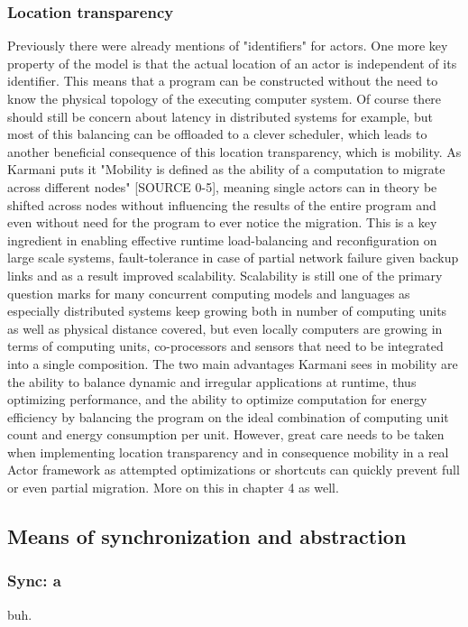 \documentclass[A4]{article}
\begin{document}
\subsubsection{Location transparency}
Previously there were already mentions of "identifiers" for actors. One more key property of the model is that the actual location of an actor is independent of its identifier. This means that a program can be constructed without the need to know the physical topology of the executing computer system. Of course there should still be concern about latency in distributed systems for example, but most of this balancing can be offloaded to a clever scheduler, which leads to another beneficial consequence of this location transparency, which is mobility.
As Karmani puts it "Mobility is defined as the ability of a computation to migrate across different nodes" [SOURCE 0-5], meaning single actors can in theory be shifted across nodes without influencing the results of the entire program and even without need for the program to ever notice the migration. This is a key ingredient in enabling effective runtime load-balancing and reconfiguration on large scale systems, fault-tolerance in case of partial network failure given backup links and as a result improved scalability. Scalability is still one of the primary question marks for many concurrent computing models and languages as especially distributed systems keep growing both in number of computing units as well as physical distance covered, but even locally computers are growing in terms of computing units, co-processors and sensors that need to be integrated into a single composition. 
The two main advantages Karmani sees in mobility are the ability to balance dynamic and irregular applications at runtime, thus optimizing performance, and the ability to optimize computation for energy efficiency by balancing the program on the ideal combination of computing unit count and energy consumption per unit. 
However, great care needs to be taken when implementing location transparency and in consequence mobility in a real Actor framework as attempted optimizations or shortcuts can quickly prevent full or even partial migration. More on this in chapter 4 as well. 

\subsection{Means of synchronization and abstraction}
\subsubsection{Sync: a}
buh.
\end{document}
